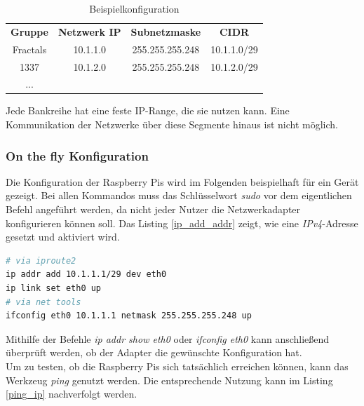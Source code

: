 \documentclass[paper=a4,fontsize=11pt]{scrartcl}%
\numberwithin{equation}{section}
\begin{document}
\begin{table}[H]
\centering
\caption{Beispielkonfiguration}
\label{labor_switch}
\begin{tabular}{cccc}
\textbf{Gruppe} & \textbf{Netzwerk IP} & \textbf{Subnetzmaske} & \textbf{CIDR}\\ 
Fractals & 10.1.1.0 & 255.255.255.248 & 10.1.1.0/29  \\
1337 & 10.1.2.0 & 255.255.255.248 & 10.1.2.0/29 \\
... & & &
\end{tabular}
\end{table}
Jede Bankreihe hat eine feste IP-Range, die sie nutzen kann. Eine Kommunikation der Netzwerke über diese Segmente hinaus ist nicht möglich.

\subsubsection{On the fly Konfiguration}
Die Konfiguration der Raspberry Pis wird im Folgenden beispielhaft für ein Gerät gezeigt. Bei allen Kommandos muss das Schlüsselwort \emph{sudo} vor dem eigentlichen Befehl angeführt werden, da nicht jeder Nutzer die Netzwerkadapter konfigurieren können soll. Das Listing \ref{ip_add_addr} zeigt, wie eine \emph{IPv4}-Adresse gesetzt und aktiviert wird.
\begin{lstlisting}[style=Bash, language=Bash, label=ip_add_addr]
# via iproute2
ip addr add 10.1.1.1/29 dev eth0
ip link set eth0 up
# via net tools
ifconfig eth0 10.1.1.1 netmask 255.255.255.248 up
\end{lstlisting}
Mithilfe der Befehle \textit{ip addr show eth0} oder \textit{ifconfig eth0} kann anschließend überprüft werden, ob der Adapter die gewünschte Konfiguration hat.\\
Um zu testen, ob die Raspberry Pis sich tatsächlich erreichen können, kann das Werkzeug \emph{ping} genutzt werden. Die entsprechende Nutzung kann im Listing \ref{ping_ip} nachverfolgt werden.
\end{document}
